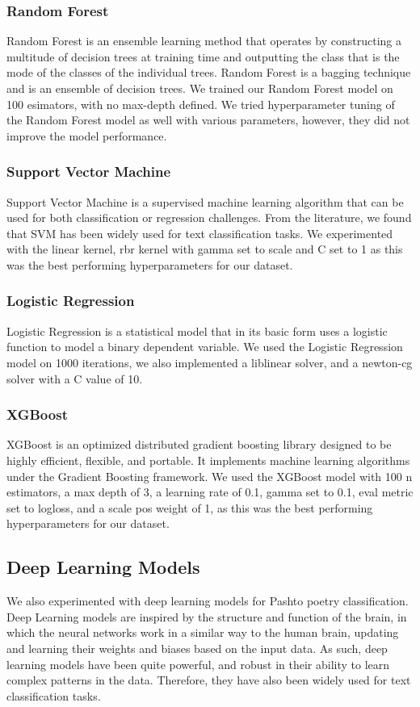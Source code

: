 \subsubsection{Random Forest}
Random Forest is an ensemble learning method that operates by constructing a multitude of decision trees at training time and outputting the class that is the mode of the classes of the individual trees. Random Forest is a bagging technique and is an ensemble of decision trees. We trained our Random Forest model on 100 esimators, with no max-depth defined. We tried hyperparameter tuning of the Random Forest model as well with various parameters, however, they did not improve the model performance. 

\subsubsection{Support Vector Machine}
Support Vector Machine is a supervised machine learning algorithm that can be used for both classification or regression challenges. From the literature, we found that SVM has been widely used for text classification tasks. We experimented with the linear kernel, rbr kernel with gamma set to scale and C set to 1 as this was the best performing hyperparameters for our dataset.

\subsubsection{Logistic Regression}
Logistic Regression is a statistical model that in its basic form uses a logistic function to model a binary dependent variable. We used the Logistic Regression model on 1000 iterations, we also implemented a liblinear solver, and a newton-cg solver with a C value of 10. 

\subsubsection{XGBoost}
XGBoost is an optimized distributed gradient boosting library designed to be highly efficient, flexible, and portable. It implements machine learning algorithms under the Gradient Boosting framework. We used the XGBoost model with 100 n estimators, a max depth of 3, a learning rate of 0.1, gamma set to 0.1, eval metric set to logloss, and a scale pos weight of 1, as this was the best performing hyperparameters for our dataset.


\subsection{Deep Learning Models}
We also experimented with deep learning models for Pashto poetry classification. Deep Learning models are inspired by the structure and function of the brain, in which the neural networks work in a similar way to the human brain, updating and learning their weights and biases based on the input data. As such, deep learning models have been quite powerful, and robust in their ability to learn complex patterns in the data. Therefore, they have also been widely used for text classification tasks.  


